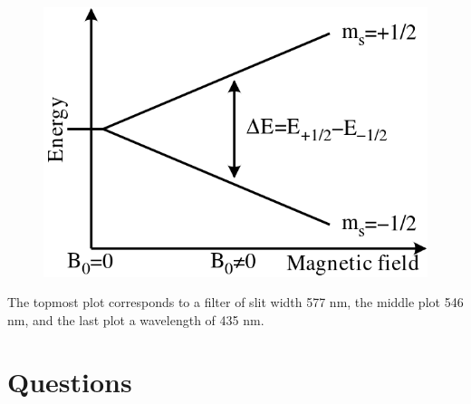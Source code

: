 \documentclass{amsart}
\begin{document}
\begin{figure}
    \begin{minipage}{.45\textwidth}
        \includegraphics[width=\textwidth]{splitting.png}
    \end{minipage}
    \begin{minipage}{.45\textwidth}

    \end{minipage}
\end{figure}

The topmost plot corresponds to a filter of slit width 577 nm, the middle plot 546 nm, and the last plot a wavelength of 435 nm.
\section{Questions}
\end{document}
